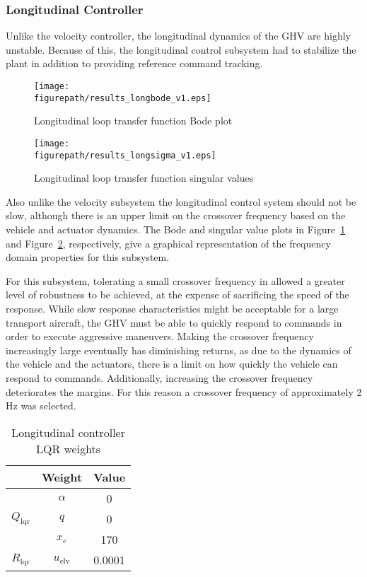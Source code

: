 \subsubsection*{Longitudinal Controller}

Unlike the velocity controller, the longitudinal dynamics of the GHV are highly unstable.
Because of this, the longitudinal control subsystem had to stabilize the plant in addition to providing reference command tracking.

\begin{figure}[H]
  \begin{center}
    \texttt{[image: \\figurepath/results\_longbode\_v1.eps]}
     \caption{Longitudinal loop transfer function Bode plot\label{fig:longbode}}
  \end{center}
\end{figure}

\begin{figure}[H]
  \begin{center}
    \texttt{[image: \\figurepath/results\_longsigma\_v1.eps]}
     \caption{Longitudinal loop transfer function singular values\label{fig:longsigma}}
  \end{center}
\end{figure}

Also unlike the velocity subsystem the longitudinal control system should not be slow, although there is an upper limit on the crossover frequency based on the vehicle and actuator dynamics.
The Bode and singular value plots in Figure~\ref{fig:longbode} and Figure~\ref{fig:longsigma}, respectively, give a graphical representation of the frequency domain properties for this subsystem.

For this subsystem, tolerating a small crossover frequency in allowed a greater level of robustness to be achieved, at the expense of sacrificing the speed of the response.
While slow response characteristics might be acceptable for a large transport aircraft, the GHV must be able to quickly respond to commands in order to execute aggressive maneuvers.
Making the crossover frequency increasingly large eventually has diminishing returns, as due to the dynamics of the vehicle and the actuators, there is a limit on how quickly the vehicle can respond to commands.
Additionally, increasing the crossover frequency deteriorates the margins.
For this reason a crossover frequency of approximately 2 Hz was selected.

\begin{table}[H]
  \centering
  \caption{Longitudinal controller LQR weights}
  \small
  \begin{tabular}{ccc}
    \toprule
    & Weight & Value \\
    \midrule
    \multirow{3}{*}{$Q_{\text{lqr}}$} & $\alpha$ & 0 \\
    & $q$ & 0 \\
    & $x_{e}$ & 170 \\
    \midrule
    $R_{\text{lqr}}$ & $u_{\text{elv}}$ & 0.0001 \\
    \bottomrule
  \end{tabular}\label{long_weights_tab}
\end{table}

